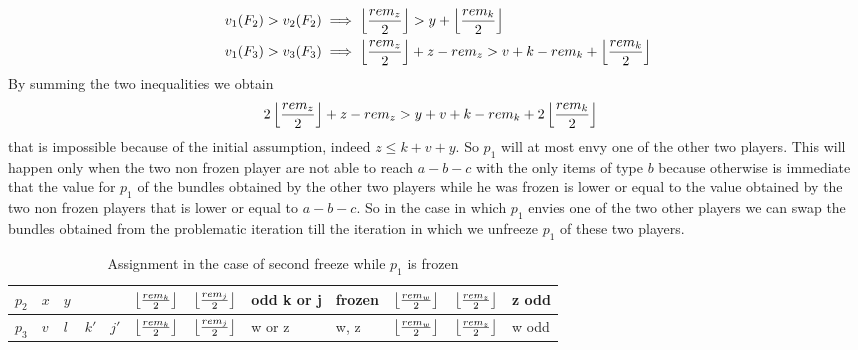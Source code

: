 \begin{itemize}
    \begin{align*}
        &v_1(F_2) > v_2(F_2)\implies \left \lfloor\frac{rem_z}{2}\right \rfloor > y + \left \lfloor\frac{rem_k}{2}\right \rfloor \\
        &v_1(F_3) > v_3(F_3)\implies \left \lfloor\frac{rem_z}{2}\right \rfloor + z-rem_z > v + k - rem_k+  \left \lfloor\frac{rem_k}{2}\right \rfloor 
    \end{align*}
    By summing the two inequalities we obtain
    \begin{align*}
        &2\left \lfloor\frac{rem_z}{2}\right \rfloor + z-rem_z > y + v + k - rem_k+  2\left \lfloor\frac{rem_k}{2}\right \rfloor 
    \end{align*}
    that is impossible because of the initial assumption, indeed $z \le k + v + y$.
    So $p_1$ will at most envy one of the other two players. This will happen only when the two non frozen player are not able to reach $a-b-c$ with the only items of type $b$ because otherwise is immediate that the value for $p_1$ of the bundles obtained by the other two players while he was frozen is lower or equal to the value obtained by the two non frozen players that is lower or equal to $a-b-c$. So in the case in which $p_1$ envies one of the two other players we can swap the bundles obtained from the problematic iteration till the iteration in which we unfreeze $p_1$ of these two players.
    
    \begin{table}[h]
        \begin{tabular}{|l|l|l|l|l|l|l|l|l|l|l|l|}
            \hline
            $p_2$ & $x$ & $y$ &      &    &   $\left \lfloor\frac{rem_k}{2}\right \rfloor$ & $\left \lfloor\frac{rem_j}{2}\right \rfloor$ & odd k or j & frozen & $\left \lfloor\frac{rem_w}{2}\right \rfloor$ & $\left \lfloor\frac{rem_z}{2}\right \rfloor$ & z odd \\ \hline
            $p_3$ & $v$ & $l$ & $k'$ & $j'$ & $\left \lfloor\frac{rem_k}{2}\right \rfloor$ & $\left \lfloor\frac{rem_j}{2}\right \rfloor$ & w or z     & w, z   & $\left \lfloor\frac{rem_w}{2}\right \rfloor$ & $\left \lfloor\frac{rem_z}{2}\right \rfloor$ & w odd \\ \hline
        \end{tabular}
        \caption{Assignment in the case of second freeze while $p_1$ is frozen}
        \label{table:abb-abb-abb-assignment-in-the-case-of-second-freeze}
    \end{table}
    

\end{itemize}
